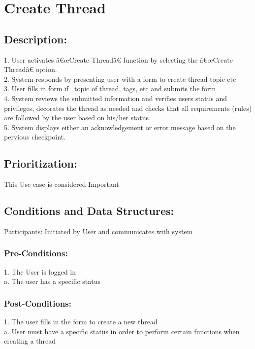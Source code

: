 \documentclass[a4paper,11pt]{article}
\begin{document}
\section{Create Thread}
\subsection*{Description:}
1.	User activates â€œCreate Threadâ€ function by selecting the â€œCreate Threadâ€ option.\\
2.	System responds by presenting user with a form to create thread topic etc\\
3.	User fills in form ïƒ  topic of thread, tags, etc and submits the form\\
4.	System reviews the submitted information and  verifies users status and privileges, decorates the thread as needed and checks that all requirements (rules) are followed by the user based on his/her status\\
5.	 System displays either an acknowledgement or error message based on the pervious checkpoint.
\subsection{Prioritization:} 
This Use case is considered Important
\subsection{Conditions and Data Structures:}
Participants:
Initiated by User and communicates with system
\subsubsection*{Pre-Conditions:}
1.	The User is logged in \\
a.	The user has a specific status
\subsubsection*{Post-Conditions:}
1.	The user fills in the form to create a new thread\\
a.	User must have a specific status in order to perform certain functions when creating a thread
\end{document}
